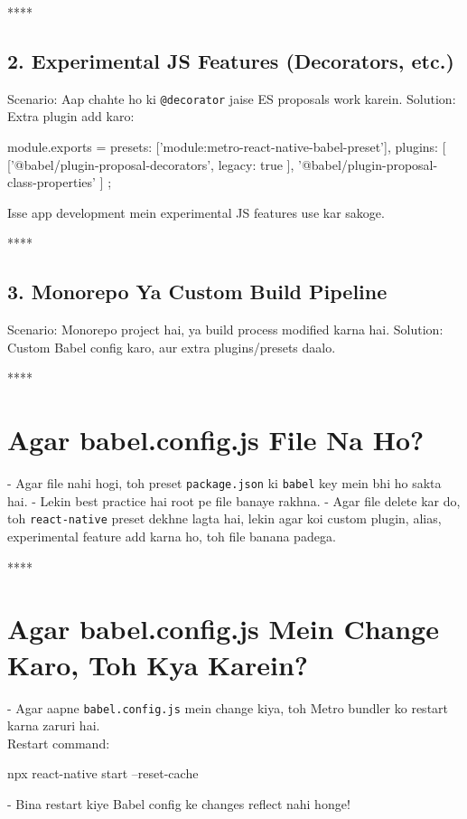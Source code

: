 \documentclass[a4paper]{article}
\newcommand\imp[1]{{\color{ImportantRed}#1}}
\begin{document}
{****
\subsection*{2. Experimental JS Features (Decorators, etc.)}
\imp{Scenario:} Aap chahte ho ki \texttt{@decorator} jaise ES proposals work karein.
\imp{Solution:}\\
Extra plugin add karo:

\begin{codeblock}
module.exports = {
  presets: ['module:metro-react-native-babel-preset'],
  plugins: [
    ['@babel/plugin-proposal-decorators', { legacy: true }],
    '@babel/plugin-proposal-class-properties'
  ]
};
\end{codeblock}

Isse app development mein experimental JS features use kar sakoge.

****
\subsection*{3. Monorepo Ya Custom Build Pipeline}
\imp{Scenario:} Monorepo project hai, ya build process modified karna hai.
\imp{Solution:}\\
Custom Babel config karo, aur extra plugins/presets daalo.

****
\section*{Agar babel.config.js File Na Ho?}
- \imp{Agar file nahi hogi, toh preset \texttt{package.json} ki \texttt{babel} key mein bhi ho sakta hai.}
- \imp{Lekin best practice hai root pe file banaye rakhna.}
- \imp{Agar file delete kar do, toh \texttt{react-native} preset dekhne lagta hai, lekin agar koi custom plugin, alias, experimental feature add karna ho, toh file banana padega.}

****
\section*{Agar babel.config.js Mein Change Karo, Toh Kya Karein?}
- \imp{Agar aapne \texttt{babel.config.js} mein change kiya, toh Metro bundler ko restart karna zaruri hai.}\\
  \imp{Restart command:}
\begin{codeblock}
npx react-native start --reset-cache
\end{codeblock}
- \imp{Bina restart kiye Babel config ke changes reflect nahi honge!}

}
\end{document}
